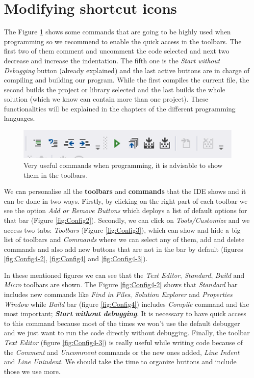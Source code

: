     \section{Modifying shortcut icons} \label{sec:Shortcuts}

The Figure \ref{fig:Commands} shows some commands that are going to be highly used when programming so we recommend to enable the quick access in the toolbars. The first two of them comment and uncomment the code selected and next two decrease and increase the indentation. The fifth one is the \textit{Start without Debugging} button (already explained) and the last active buttons are in charge of compiling and building our program. While the first compiles the current file, the second builds the project or library selected and the last builds the whole solution (which we know can contain more than one project). These functionalities will be explained in the chapters of the different programming languages. 

\begin{figure}[h]
    \centering
    \includegraphics[width= 0.9 \textwidth]{Figures/Commands}
    \caption{Very useful commands when programming, it is advisable to show them in the toolbars.}
    \label{fig:Commands}
\end{figure}

\vspace{0.5cm}
We can personalise all the \textbf{toolbars} and \textbf{commands} that the IDE shows and it can be done in two ways. Firstly, by clicking on the right part of each toolbar we see the option \textit{Add or Remove Buttons} which deploys a list of default options for that bar (Figure \ref{fig:Config2}). Secondly, we can click on \textit{Tools/Customize} and we access two tabs: \textit{Toolbars} (Figure \ref{fig:Config3}), which can show and hide a big list of toolbars and \textit{Commands} where we can select any of them, add and delete commands and also add new buttons that are not in the bar by default (figures \ref{fig:Config4-2}, \ref{fig:Config4} and \ref{fig:Config4-3}). 

In these mentioned figures we can see that the \textit{Text Editor}, \textit{Standard}, \textit{Build} and \textit{Micro} toolbars are shown. The Figure \ref{fig:Config4-2} shows that \textit{Standard} bar includes new commands like \textit{Find in Files}, \textit{Solution Explorer} and \textit{Properties Window} while \textit{Build} bar (figure \ref{fig:Config4}) includes \textit{Compile} command and the most important; \textbf{\textit{Start without debugging}}.\label{StartwD} It is necessary to have quick access to this command because most of the times we won't use the default debugger and we just want to run the code directly without debugging. Finally, the toolbar \textit{Text Editor} (figure \ref{fig:Config4-3}) is really useful while writing code because of the \textit{Comment} and \textit{Uncomment} commands or the new ones added, \textit{Line Indent} and \textit{Line Unindent}. We should take the time to organize buttons and include those we use more. 

